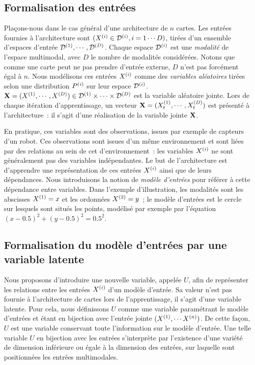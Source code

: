 \documentclass[../main]{subfiles}
\begin{document}
\subsection{Formalisation des entrées}

Plaçons-nous dans le cas général d'une architecture de $n$ cartes.
Les entrées fournies à l'architecture sont $(X^{({i})} \in \mathcal{D}^{({i})}, i = 1 \cdots D)$, tirées d'un ensemble d'espaces d'entrée $\mathcal{D}^{({1})},\cdots,\mathcal{D}^{({D})}$. 
Chaque espace $\mathcal{D}^{({i})}$ est une \emph{modalité} de l'espace multimodal, avec $D$ le nombre de modalités considérées. Notons que comme une carte peut ne pas prendre d'entrée externe, $D$ n'est pas forcément égal à $n$. 
Nous modélisons ces entrées $X^{({i})}$ comme des \emph{variables aléatoires} tirées selon une distribution $P^{({i})}$ sur leur espace $\mathcal{D}^{({i})}$.
$\mathbf{X} = (X^{({1})}, \cdots, X^{({D})}) \in \mathcal{D}^{({1})} \times \cdots \times \mathcal{D}^{({D})}$ est la variable aléatoire jointe. 
Lors de chaque itération d'apprentissage, un vecteur $\mathbf{X} = (X^{({1})}_t, \cdots , X^{({D})}_t)$ est présenté à l'architecture~: il s'agit d'une réalisation de la variable jointe $\mathbf{X}$.

En pratique, ces variables sont des observations, issues par exemple de capteurs d'un robot. Ces observations sont issues d'un même environnement et sont liées par des relations au sein de cet d'environnement~: les variables $X^{({i})}$ ne sont généralement pas des variables indépendantes.
Le but de l'architecture est d'apprendre une représentation de ces entrées $X^{({i})}$ ainsi que de leurs dépendances.
Nous introduisons la notion de \emph{modèle d'entrées} pour référer à cette dépendance entre variables.
Dans l'exemple d'illustration, les modalités sont les abscisses $X^{({1})} = x$ et les ordonnées $X^{({2})} = y$~; le modèle d'entrées est le cercle sur lesquels sont situés les points, modélisé par exemple par l'équation $(x - 0.5)^2 + (y - 0.5)^2 = 0.5^2$.

\subsection{Formalisation du modèle d'entrées par une variable latente}\label{sec:U}

Nous proposons d'introduire une nouvelle variable, appelée $U$, afin de représenter les relations entre les entrées $X^{({i})}$ d'un modèle d'entrée. Sa valeur n'est pas fournie à l'architecture de cartes lors de l'apprentissage, il s'agit d'une variable latente.
Pour cela, nous définissons $U$ comme une variable paramétrant le modèle d'entrées et étant en bijection avec l'entrée jointe $(X^{({1})}, \cdots X^{({n})})$. De cette façon, $U$ est une variable conservant toute l'information sur le modèle d'entrée.
Une telle variable $U$ en bijection avec les entrées s'interprète par l'existence d'une variété de dimension inférieure ou égale à la dimension des entrées, sur laquelle sont positionnées les entrées multimodales.
\end{document}

